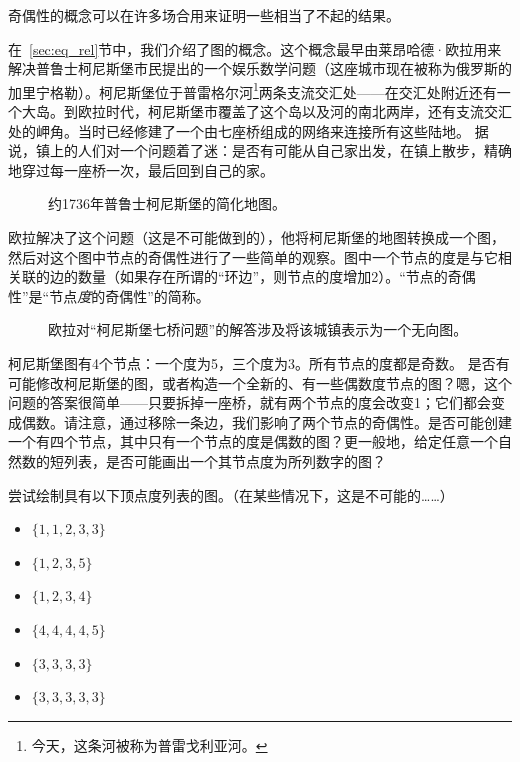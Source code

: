 奇偶性的概念可以在许多场合用来证明一些相当了不起的结果。

在~\ref{sec:eq_rel}节中，我们介绍了图的概念。这个概念最早由莱昂哈德·欧拉用来解决普鲁士柯尼斯堡市民提出的一个娱乐数学问题（这座城市现在被称为俄罗斯的加里宁格勒）。柯尼斯堡位于普雷格尔河\footnote{今天，这条河被称为普雷戈利亚河。}两条支流交汇处——在交汇处附近还有一个大岛。到欧拉时代，柯尼斯堡市覆盖了这个岛以及河的南北两岸，还有支流交汇处的岬角。当时已经修建了一个由七座桥组成的网络来连接所有这些陆地。
据说，镇上的人们对一个问题着了迷：是否有可能从自己家出发，在镇上散步，精确地穿过每一座桥一次，最后回到自己的家。

\begin{figure}[!hbtp]
\begin{center}

\end{center}
\caption[普鲁士，柯尼斯堡。]{约1736年普鲁士柯尼斯堡的简化地图。}
\label{fig:kon_map} 
\end{figure}

欧拉解决了这个问题（这是不可能做到的），他将柯尼斯堡的地图转换成一个图，然后对这个图中节点的奇偶性进行了一些简单的观察。图中一个节点的度是与它相关联的边的数量（如果存在所谓的“环边”，则节点的度增加2）。“节点的奇偶性”是“节点\emph{度}的奇偶性”的简称。

\begin{figure}[!hbtp]
\begin{center}

\end{center}
\caption[普鲁士柯尼斯堡的图表示。]{欧拉对“柯尼斯堡七桥问题”的解答涉及将该城镇表示为一个无向图。}
\label{fig:kon_graph} 
\end{figure}

柯尼斯堡图有4个节点：一个度为5，三个度为3。所有节点的度都是奇数。
是否有可能修改柯尼斯堡的图，或者构造一个全新的、有一些偶数度节点的图？嗯，这个问题的答案很简单——只要拆掉一座桥，就有两个节点的度会改变1；它们都会变成偶数。请注意，通过移除一条边，我们影响了两个节点的奇偶性。是否可能创建一个有四个节点，其中只有一个节点的度是偶数的图？更一般地，给定任意一个自然数的短列表，是否可能画出一个其节点度为所列数字的图？

\begin{exer}
尝试绘制具有以下顶点度列表的图。（在某些情况下，这是不可能的……）

\begin{itemize}
\item[-] $\{1,1,2,3,3\}$
\item[-] $\{1,2,3,5\}$
\item[-] $\{1,2,3,4\}$
\item[-] $\{4,4,4,4,5\}$
\item[-] $\{3,3,3,3\}$
\item[-] $\{3,3,3,3,3\}$
\end{itemize}
\end{exer} 

